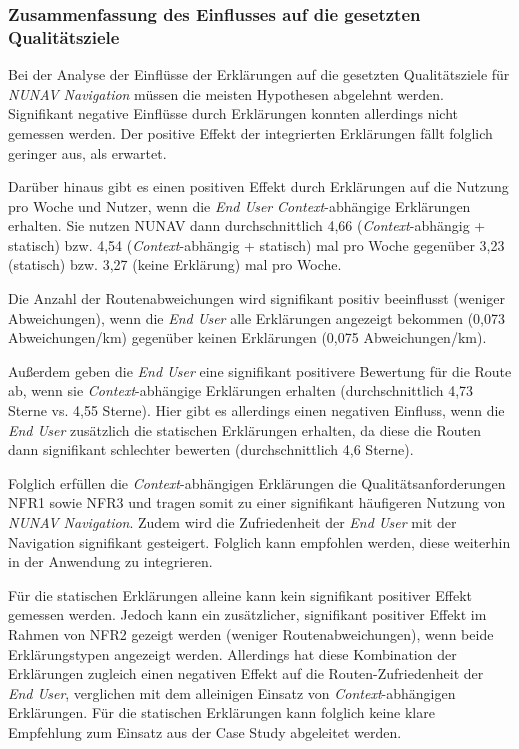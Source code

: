 \subsubsection{Zusammenfassung des Einflusses auf die gesetzten Qualitätsziele}

Bei der Analyse der Einflüsse der Erklärungen auf die gesetzten Qualitätsziele für \textit{NUNAV Navigation} müssen die meisten Hypothesen abgelehnt werden. Signifikant negative Einflüsse durch Erklärungen konnten allerdings nicht gemessen werden. Der positive Effekt der integrierten Erklärungen fällt folglich geringer aus, als erwartet. 

Darüber hinaus gibt es einen positiven Effekt durch Erklärungen auf die Nutzung pro Woche und Nutzer, wenn die \textit{End User} \textit{Context}-abhängige Erklärungen erhalten. Sie nutzen NUNAV dann durchschnittlich 4,66 (\textit{Context}-abhängig + statisch) bzw. 4,54 (\textit{Context}-abhängig + statisch) mal pro Woche gegenüber 3,23 (statisch) bzw. 3,27 (keine Erklärung) mal pro Woche.

Die Anzahl der Routenabweichungen wird signifikant positiv beeinflusst (weniger Abweichungen), wenn die \textit{End User} alle Erklärungen angezeigt bekommen (0,073 Abweichungen/km) gegenüber keinen Erklärungen (0,075 Abweichungen/km). 

Außerdem geben die \textit{End User} eine signifikant positivere Bewertung für die Route ab, wenn sie \textit{Context}-abhängige Erklärungen erhalten (durchschnittlich 4,73 Sterne vs. 4,55 Sterne). Hier gibt es allerdings einen negativen Einfluss, wenn die \textit{End User} zusätzlich die statischen Erklärungen erhalten, da diese die Routen dann signifikant schlechter bewerten (durchschnittlich 4,6 Sterne).

Folglich erfüllen die \textit{Context}-abhängigen Erklärungen die Qualitätsanforderungen NFR1 sowie NFR3 und tragen somit zu einer signifikant häufigeren Nutzung von \textit{NUNAV Navigation}. Zudem wird die Zufriedenheit der \textit{End User} mit der Navigation signifikant gesteigert. Folglich kann empfohlen werden, diese weiterhin in der Anwendung zu integrieren.

Für die statischen Erklärungen alleine kann kein signifikant positiver Effekt gemessen werden. Jedoch kann ein zusätzlicher, signifikant positiver Effekt im Rahmen von NFR2 gezeigt werden (weniger Routenabweichungen), wenn beide Erklärungstypen angezeigt werden. Allerdings hat diese Kombination der Erklärungen zugleich einen negativen Effekt auf die Routen-Zufriedenheit der \textit{End User}, verglichen mit dem alleinigen Einsatz von \textit{Context}-abhängigen Erklärungen.
Für die statischen Erklärungen kann folglich keine klare Empfehlung zum Einsatz aus der Case Study abgeleitet werden.

\newpage